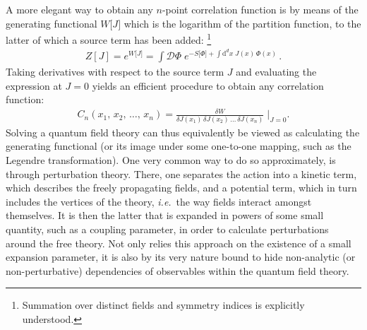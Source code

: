 \documentclass[11pt]{book}
\newcommand\ie{\textit{i.e.}\ }
\numberwithin{equation}{chapter}
\begin{document}
A more elegant way to obtain any $n$-point correlation function is
by means of the generating functional $W \lbrack J \rbrack$
which is the logarithm of the partition function, to the latter of which
a source term
has been added:%
\footnote{%
  Summation over distinct fields and symmetry indices is explicitly
  understood.
}
\begin{align}
  Z[J] =
  e^{ W \lbrack J \rbrack }
  = \int \mathcal D \Phi \;
  e^{
    - S \lbrack \Phi \rbrack
    + \int \mathrm d^dx \; J(x) \, \Phi(x)
  } \,.
  \label{eq:modpartitionfct}
\end{align}
Taking derivatives with respect to the source term $J$ and evaluating
the expression at $J=0$ yields an efficient procedure to obtain
any correlation function:
\begin{align}
  C_n(x_1, \, x_2,\, \dots, \, x_n) =
  \frac{ \delta W }{ \delta J(x_1) \, \delta J(x_2) \, \dots \, \delta J(x_n) }
  \; \bigg|_{J=0} .
\end{align}
Solving a quantum field theory can
thus equivalently be viewed as calculating the generating functional
(or its image under some one-to-one mapping, such as the
Legendre transformation).
One very common way to do so approximately, is through perturbation
theory. There, one separates the action into a kinetic term, which
describes the freely propagating fields, and a potential term,
which in turn includes the vertices of the theory, \ie the way fields
interact amongst themselves. It is then the latter that is expanded
in powers of some small quantity, such as a coupling parameter,
in order to calculate perturbations around the free theory.
Not only relies this approach on the existence of a small expansion
parameter, it is also by its very nature bound to hide non-analytic
(or non-perturbative) dependencies of observables within the quantum field theory.
\end{document}
